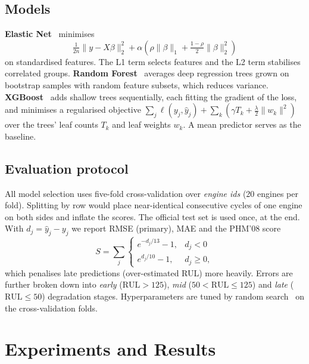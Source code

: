\documentclass[conference]{IEEEtran}
\begin{document}
\subsection{Models}
\textbf{Elastic Net}~\cite{zou2005elasticnet} minimises
\begin{equation}
  \tfrac{1}{2n}\|y-X\beta\|_2^2+\alpha\left(\rho\|\beta\|_1+\tfrac{1-\rho}{2}\|\beta\|_2^2\right)
\end{equation}
on standardised features. The L1 term selects features and the L2 term stabilises correlated groups. \textbf{Random Forest}~\cite{breiman2001rf} averages deep regression trees grown on bootstrap samples with random feature subsets, which reduces variance. \textbf{XGBoost}~\cite{chen2016xgboost} adds shallow trees sequentially, each fitting the gradient of the loss, and minimises a regularised objective $\sum_j \ell(y_j,\hat y_j)+\sum_k\left(\gamma T_k+\tfrac{\lambda}{2}\|w_k\|^2\right)$ over the trees' leaf counts $T_k$ and leaf weights $w_k$. A mean predictor serves as the baseline.

\subsection{Evaluation protocol}
All model selection uses five-fold cross-validation over \emph{engine ids} (20 engines per fold). Splitting by row would place near-identical consecutive cycles of one engine on both sides and inflate the scores. The official test set is used once, at the end. With $d_j=\hat y_j-y_j$ we report RMSE (primary), MAE and the PHM'08 score~\cite{saxena2008damage}
\begin{equation}
  S=\sum_j\begin{cases}e^{-d_j/13}-1, & d_j<0\\ e^{d_j/10}-1, & d_j\ge 0,\end{cases}
\end{equation}
which penalises late predictions (over-estimated RUL) more heavily. Errors are further broken down into \emph{early} ($\text{RUL}>125$), \emph{mid} ($50<\text{RUL}\le125$) and \emph{late} ($\text{RUL}\le 50$) degradation stages. Hyperparameters are tuned by random search~\cite{bergstra2012random} on the cross-validation folds.

\section{Experiments and Results}
\end{document}
